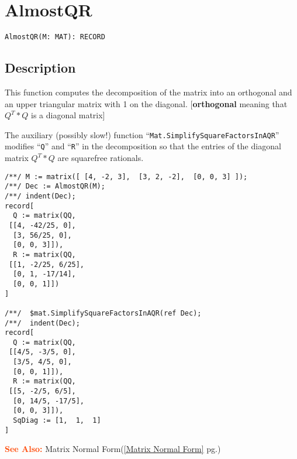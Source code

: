 \documentclass[a4paper]{mybook}
\newenvironment{command}{}{} %
\newcommand\SeeAlso{\par\textcolor{OrangeRed}{\textbf{\large See Also: }}}
\begin{document}
\section{AlmostQR}
\label{AlmostQR}
\begin{command} %


\begin{Verbatim}[label=syntax, rulecolor=\color{MidnightBlue},
frame=single]
AlmostQR(M: MAT): RECORD
\end{Verbatim}


\subsection*{Description}

This function computes the decomposition of the matrix into an
orthogonal and an upper triangular matrix with 1 on the diagonal.
[\textbf{orthogonal} meaning that $Q^{T} * Q$ is a diagonal matrix]
\par 
The auxiliary (possibly slow!) function ``\verb&Mat.SimplifySquareFactorsInAQR&''
modifies ``\verb&Q&'' and ``\verb&R&'' in the decomposition so that the entries of the
diagonal matrix $Q^{T} * Q$ are squarefree rationals.
\begin{Verbatim}[label=example, rulecolor=\color{PineGreen}, frame=single]
/**/ M := matrix([ [4, -2, 3],  [3, 2, -2],  [0, 0, 3] ]);
/**/ Dec := AlmostQR(M);
/**/ indent(Dec);
record[
  Q := matrix(QQ,
 [[4, -42/25, 0],
  [3, 56/25, 0],
  [0, 0, 3]]),
  R := matrix(QQ,
 [[1, -2/25, 6/25],
  [0, 1, -17/14],
  [0, 0, 1]])
]

/**/  $mat.SimplifySquareFactorsInAQR(ref Dec);
/**/  indent(Dec);
record[
  Q := matrix(QQ,
 [[4/5, -3/5, 0],
  [3/5, 4/5, 0],
  [0, 0, 1]]),
  R := matrix(QQ,
 [[5, -2/5, 6/5],
  [0, 14/5, -17/5],
  [0, 0, 3]]),
  SqDiag := [1,  1,  1]
]
\end{Verbatim}


\SeeAlso %
  Matrix Normal Form(\ref{Matrix Normal Form} pg.\pageref{Matrix Normal Form})
\end{command} %
\end{document}
